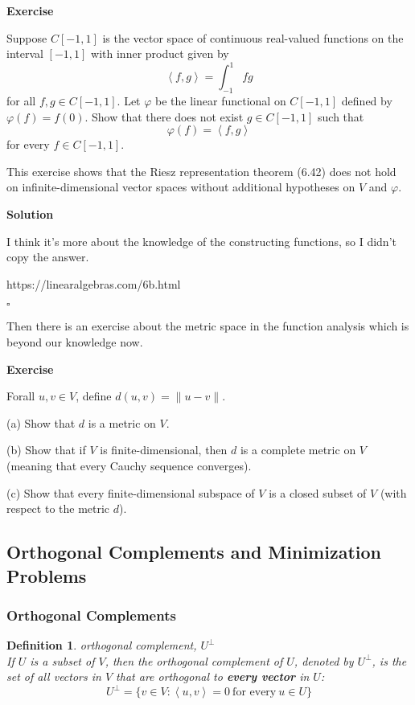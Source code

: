 \documentclass{article}
\newtheorem{definition}{Definition}[subsection]
\newenvironment{exercise}{%
{\textbf{Exercise\\}
    }
}{
}
\newenvironment{solution}{%
{
    \textbf{Solution\\}
    }
}{
  \hfill $\square$ 
  \par\bigskip 
}
\begin{document}
\begin{CJK}{UTF8}{gkai}
\begin{exercise}
    Suppose $C[-1,1]$ is the vector space of continuous real-valued functions on the interval $[-1,1]$ with inner product given by
    \[\left< f, g\right> = \int_{-1}^{1}fg\]
    for all $f,g \in C[-1,1]$. Let $\varphi$ be the linear functional on $C[-1,1]$ defined by $\varphi(f) = f(0)$. Show that there does not exist $g \in C[-1,1]$ such that
    \[\varphi(f) = \left<f,g\right>\]
    for every $f \in C[-1,1]$.

    This exercise shows that the Riesz representation theorem (6.42) does not hold on infinite-dimensional vector spaces without additional hypotheses on $V$ and $\varphi$.
\end{exercise}

\begin{solution}
    I think it's more about the knowledge of the constructing functions, so I didn't copy the answer.

    https://linearalgebras.com/6b.html
\end{solution}

Then there is an exercise about the metric space in the function analysis which is beyond our knowledge now.

\begin{exercise}
    Forall $u,v \in V$, define $d(u,v) = \|u-v\|$.

    (a) Show that $d$ is a metric on $V$.

    (b) Show that if $V$ is finite-dimensional, then $d$ is a complete metric on $V$
    (meaning that every Cauchy sequence converges).

    (c) Show that every finite-dimensional subspace of $V$ is a closed subset of $V$ (with respect to the metric $d$).
\end{exercise}


\subsection{Orthogonal Complements and Minimization Problems}

\subsubsection{Orthogonal Complements}

\begin{definition}
    orthogonal complement, $U^\bot$\\

    If $U$ is a subset of $V$, then the orthogonal complement of $U$, denoted by $U^\bot$, is the set of all vectors in $V$ that are orthogonal to \textbf{every vector} in $U$: 
    \[U^\bot = \{v \in V : \left<u,v\right> = 0 ~\text{for every}~ u \in U\}\]
\end{definition}


\end{CJK}
\end{document}
